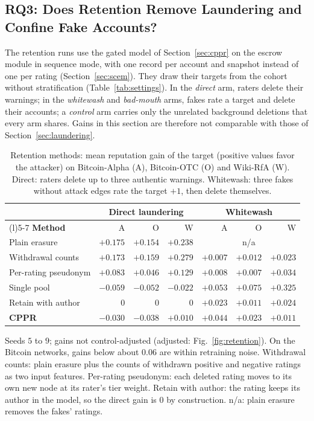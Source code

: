 \documentclass[lettersize,journal]{IEEEtran}
\begin{document}
\subsection{RQ3: Does Retention Remove Laundering and Confine Fake Accounts?}
\label{subsec:results_vpe}

The retention runs use the gated model of Section~\ref{sec:cppr} on the escrow module in sequence mode, with one record per account and snapshot instead of one per rating (Section~\ref{sec:scem}). They draw their targets from the cohort without stratification (Table~\ref{tab:settings}).
In the \emph{direct} arm, raters delete their warnings; in the \emph{whitewash} and \emph{bad-mouth} arms, fakes rate a target and delete their accounts; a \emph{control} arm carries only the unrelated background deletions that every arm shares.
Gains in this section are therefore not comparable with those of Section~\ref{sec:laundering}.

\begin{table}[!t]
\caption{Retention methods: mean reputation gain of the target (positive values favor the attacker) on Bitcoin-Alpha (A), Bitcoin-OTC (O) and Wiki-RfA (W). Direct: raters delete up to three authentic warnings. Whitewash: three fakes without attack edges rate the target $+1$, then delete themselves.}
\label{tab:cppr_main}
\centering
\footnotesize
\setlength{\tabcolsep}{2.4pt}
\begin{tabular}{@{}>{\raggedright\arraybackslash}p{0.72in}rrrrrr@{}}
\toprule
 & \multicolumn{3}{c}{\textbf{Direct laundering}} & \multicolumn{3}{c}{\textbf{Whitewash}} \\
\cmidrule(lr){2-4}\cmidrule(l){5-7}
\textbf{Method} & A & O & W & A & O & W \\
\midrule
Plain erasure & $+0.175$ & $+0.154$ & $+0.238$ & \multicolumn{3}{c}{n/a} \\
Withdrawal counts & $+0.173$ & $+0.159$ & $+0.279$ & $+0.007$ & $+0.012$ & $+0.023$ \\
Per-rating pseudonym & $+0.083$ & $+0.046$ & $+0.129$ & $+0.008$ & $+0.007$ & $+0.034$ \\
Single pool & $-0.059$ & $-0.052$ & $-0.022$ & $+0.053$ & $+0.075$ & $+0.325$ \\
Retain with author & $0$ & $0$ & $0$ & $+0.023$ & $+0.011$ & $+0.024$ \\
\textbf{CPPR} & $\mathbf{-0.030}$ & $\mathbf{-0.038}$ & $\mathbf{+0.010}$ & $\mathbf{+0.044}$ & $\mathbf{+0.023}$ & $\mathbf{+0.011}$ \\
\bottomrule
\end{tabular}
\par\smallskip
\parbox{\columnwidth}{\footnotesize Seeds $5$ to $9$; gains not control-adjusted (adjusted: Fig.~\ref{fig:retention}). On the Bitcoin networks, gains below about $0.06$ are within retraining noise. Withdrawal counts: plain erasure plus the counts of withdrawn positive and negative ratings as two input features. Per-rating pseudonym: each deleted rating moves to its own new node at its rater's tier weight. Retain with author: the rating keeps its author in the model, so the direct gain is $0$ by construction. n/a: plain erasure removes the fakes' ratings.}
\end{table}
\end{document}

